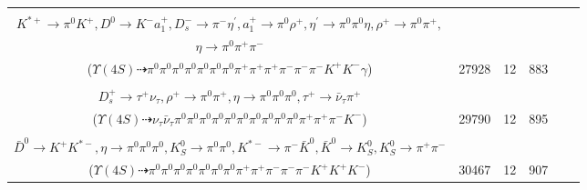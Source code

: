 \documentclass[landscape]{article}
\newcounter{rownumbers}
\newcommand\rn{\stepcounter{rownumbers}\arabic{rownumbers}}
\newcommand{\EOLP}{\\ \hline} %
\newcommand{\topoTags}[1]{#1} %
\begin{document}
\begin{longtable}{clcccc}
\rn & \makecell[l]{ $ 
\Upsilon(4S) \rightarrow B^{0} \bar{B}^{0} ,
B^{0} \rightarrow \pi^{-} K^{*}(1410)^{+} ,
\bar{B}^{0} \rightarrow D^{*+} D_{s}^{*-} ,
K^{*}(1410)^{+} \rightarrow \pi^{0} K^{*+} ,
D^{*+} \rightarrow \pi^{+} D^{0} ,
D_{s}^{*-} \rightarrow D_{s}^{-} \gamma ,
$ \\ $
K^{*+} \rightarrow \pi^{0} K^{+} ,
D^{0} \rightarrow K^{-} a_{1}^{+} ,
D_{s}^{-} \rightarrow \pi^{-} \eta^{\prime} ,
a_{1}^{+} \rightarrow \pi^{0} \rho^{+} ,
\eta^{\prime} \rightarrow \pi^{0} \pi^{0} \eta ,
\rho^{+} \rightarrow \pi^{0} \pi^{+} ,
$ \\ $
\eta \rightarrow \pi^{0} \pi^{+} \pi^{-} 
$ \\ ($
\Upsilon(4S) \dashrightarrow \pi^{0} \pi^{0} \pi^{0} \pi^{0} \pi^{0} \pi^{0} \pi^{0} \pi^{+} \pi^{+} \pi^{+} \pi^{-} \pi^{-} \pi^{-} K^{+} K^{-} \gamma 
$) } & \topoTags{27928 & }12 & 883 \EOLP

\rn & \makecell[l]{ $ 
\Upsilon(4S) \rightarrow B^{0} \bar{B}^{0} ,
B^{0} \rightarrow \rho^{-} \eta \bar{D}^{0} D_{s}^{+} ,
\bar{B}^{0} \rightarrow \rho^{+} K^{-} ,
\rho^{-} \rightarrow \pi^{0} \pi^{-} ,
\eta \rightarrow \pi^{0} \pi^{0} \pi^{0} ,
\bar{D}^{0} \rightarrow \pi^{0} \pi^{0} \eta ,
$ \\ $
D_{s}^{+} \rightarrow \tau^{+} \nu_{\tau} ,
\rho^{+} \rightarrow \pi^{0} \pi^{+} ,
\eta \rightarrow \pi^{0} \pi^{0} \pi^{0} ,
\tau^{+} \rightarrow \bar{\nu}_{\tau} \pi^{+} 
$ \\ ($
\Upsilon(4S) \dashrightarrow \nu_{\tau} \bar{\nu}_{\tau} \pi^{0} \pi^{0} \pi^{0} \pi^{0} \pi^{0} \pi^{0} \pi^{0} \pi^{0} \pi^{0} \pi^{0} \pi^{+} \pi^{+} \pi^{-} K^{-} 
$) } & \topoTags{29790 & }12 & 895 \EOLP

\rn & \makecell[l]{ $ 
\Upsilon(4S) \rightarrow B^{0} \bar{B}^{0} ,
B^{0} \rightarrow \pi^{-} K_2^{*+} ,
\bar{B}^{0} \rightarrow \bar{K}^{*} D^{0} \bar{D}^{0} ,
K_2^{*+} \rightarrow \pi^{0} K^{+} ,
\bar{K}^{*} \rightarrow \pi^{+} K^{-} ,
D^{0} \rightarrow \pi^{0} \eta K_{S}^{0} ,
$ \\ $
\bar{D}^{0} \rightarrow K^{+} K^{*-} ,
\eta \rightarrow \pi^{0} \pi^{0} \pi^{0} ,
K_{S}^{0} \rightarrow \pi^{0} \pi^{0} ,
K^{*-} \rightarrow \pi^{-} \bar{K}^{0} ,
\bar{K}^{0} \rightarrow K_{S}^{0} ,
K_{S}^{0} \rightarrow \pi^{+} \pi^{-} 
$ \\ ($
\Upsilon(4S) \dashrightarrow \pi^{0} \pi^{0} \pi^{0} \pi^{0} \pi^{0} \pi^{0} \pi^{0} \pi^{+} \pi^{+} \pi^{-} \pi^{-} \pi^{-} K^{+} K^{+} K^{-} 
$) } & \topoTags{30467 & }12 & 907 \EOLP


\end{longtable}
\end{document}
